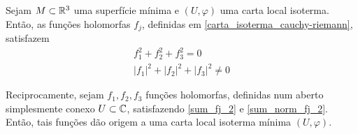 \begin{lema}\label{lema_fj_2}
	Sejam $M \subset \mathbb{R}^3$ uma superfície mínima e $(U, \varphi)$ uma carta local isoterma. Então, as funções holomorfas $f_j$, definidas em \ref{carta_isoterma_cauchy-riemann}, satisfazem
	\begin{gather}\label{sum_fj_2}
	f_1^2 + f_2^2 + f_3^2 = 0\\ \label{sum_norm_fj_2}
	|f_1|^2 + |f_2|^2 + |f_3|^2 \neq 0
	\end{gather}
	
	Reciprocamente, sejam $f_1, f_2, f_3$ funções holomorfas, definidas num aberto simplesmente conexo $U \subset \mathbb{C}$, satisfazendo \ref{sum_fj_2} e \ref{sum_norm_fj_2}. Então, tais funções dão origem a uma carta local isoterma mínima $(U, \varphi)$.
\end{lema}

